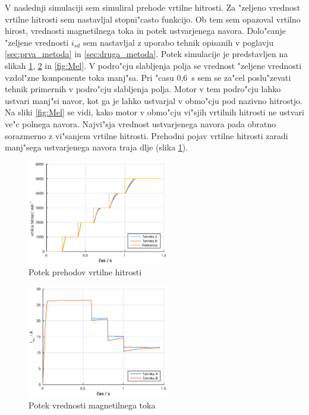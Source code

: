 \documentclass[journal,a4paper,twoside]{sty/IEEEtran}
\begin{document}
V naslednji simulaciji sem simuliral prehode vrtilne hitrosti. Za "zeljeno vrednost vrtilne hitrosti sem nastavljal stopni"casto funkcijo. Ob tem sem opazoval vrtilno hirost, vrednosti magnetilnega toka in potek ustvarjenega navora. Dolo"canje "zeljene vrednosti $i_{sd}$ sem nastavljal z uporabo tehnik opisanih v poglavju \ref{sec:prva_metoda} in \ref{sec:druga_metoda}.
Potek simulacije je predstavljen na slikah \ref{fig:vrtilna}, \ref{fig:imr} in \ref{fig:Mel}. V podro"cju slabljenja polja se vrednost "zeljene vrednosti vzdol"zne komponente toka manj"sa.
Pri "casu 0,6~s  sem se za"cel poslu"zevati tehnik primernih v podro"cju slabljenja polja. Motor v tem podro"cju lahko ustvari manj"si navor, kot ga je lahko ustvarjal v obmo"cju pod nazivno hitrostjo. Na sliki \ref{fig:Mel} se vidi, kako motor v obmo"cju vi"sjih vrtilnih hitrosti ne ustvari ve"c polnega navora. Najvi"sja vrednost ustvarjenega navora pada obratno sorazmerno z vi"sanjem vrtilne hitrosti. Prehodni pojav vrtilne hitrosti zaradi manj"sega ustvarjenega navora traja dlje (slika \ref{fig:vrtilna}).

\begin{figure}
\includegraphics[width=0.55\textwidth]{fig_vrtilna.eps}
\caption{Potek prehodov vrtilne hitrosti}
\label{fig:vrtilna}
\end{figure}

\begin{figure}
\includegraphics[width=0.55\textwidth]{fig_imr.eps}
\caption{Potek vrednosti magnetilnega toka}
\label{fig:imr}
\end{figure}
\end{document}
